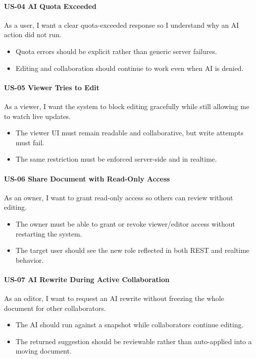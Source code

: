 \paragraph{US-04 AI Quota Exceeded} As a user, I want a clear quota-exceeded response so I understand why an
AI action did not run.
\begin{itemize}
  \item Quota errors should be explicit rather than generic server failures.
  \item Editing and collaboration should continue to work even when AI is denied.
\end{itemize}

\paragraph{US-05 Viewer Tries to Edit} As a viewer, I want the system to block editing gracefully while
still allowing me to watch live updates.
\begin{itemize}
  \item The viewer UI must remain readable and collaborative, but write attempts must fail.
  \item The same restriction must be enforced server-side and in realtime.
\end{itemize}

\paragraph{US-06 Share Document with Read-Only Access} As an owner, I want to grant read-only access so
others can review without editing.
\begin{itemize}
  \item The owner must be able to grant or revoke viewer/editor access without restarting the system.
  \item The target user should see the new role reflected in both REST and realtime behavior.
\end{itemize}

\paragraph{US-07 AI Rewrite During Active Collaboration} As an editor, I want to request an AI rewrite
without freezing the whole document for other collaborators.
\begin{itemize}
  \item The AI should run against a snapshot while collaborators continue editing.
  \item The returned suggestion should be reviewable rather than auto-applied into a moving document.
\end{itemize}

